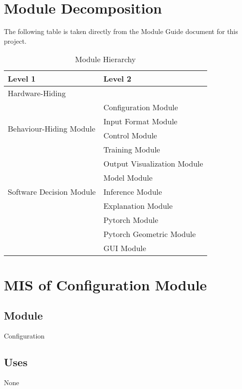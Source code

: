 \documentclass[12pt, titlepage]{article}
\begin{document}
\section{Module Decomposition}

The following table is taken directly from the Module Guide document for this project.

\begin{table}[h!]
\centering
\begin{tabular}{p{} p{}}
\toprule
\textbf{Level 1} & \textbf{Level 2}\\
\midrule

{Hardware-Hiding} & ~ \\
\midrule

\multirow{4}{0.3\textwidth}{Behaviour-Hiding Module} & Configuration Module \\
& Input Format Module\\
& Control Module\\
& Training Module\\
& Output Visualization Module\\
\midrule

\multirow{3}{0.3\textwidth}{Software Decision Module} & {Model Module}\\
& Inference Module\\
& Explanation Module\\
& Pytorch Module\\
& Pytorch Geometric Module\\
& GUI Module\\
\bottomrule

\end{tabular}
\caption{Module Hierarchy}
\label{TblMH}
\end{table}

\newpage


\section{MIS of Configuration Module} \label{Configurations}

\subsection{Module}
Configuration

\subsection{Uses}
None
\end{document}
